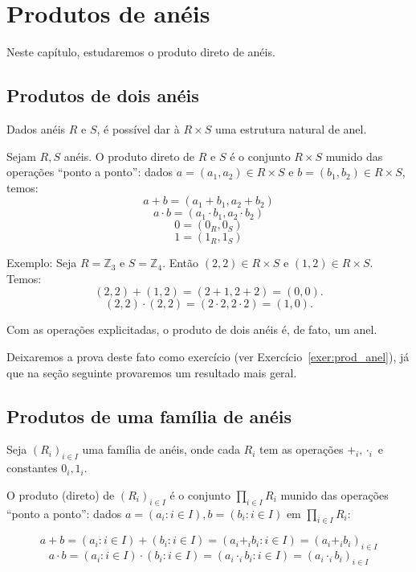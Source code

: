 \chapter{Produtos de anéis}
Neste capítulo, estudaremos o produto direto de anéis.

\section{Produtos de dois anéis}
Dados anéis $R$ e $S$, é possível dar à $R\times S$ uma estrutura natural de anel.
\begin{definition}
    Sejam $R, S$ anéis.
    O produto direto de $R$ e $S$ é o conjunto $R\times S$ munido das operações ``ponto a ponto'': dados $a=(a_1, a_2)\in R\times S$ e $b=(b_1, b_2)\in R\times S$, temos:
    \[a+b=(a_1+b_1, a_2+b_2)\]
    \[a\cdot b=(a_1\cdot b_1, a_2\cdot b_2)\]
    \[0=(0_R, 0_S)\]
    \[1=(1_R, 1_S)\]
\end{definition}

Exemplo: Seja $R=\mathbb Z_3$ e $S=\mathbb Z_4$. Então $(2, 2)\in R\times S$ e $(1, 2)\in R\times S$. Temos:
\[(2, 2)+(1, 2)=(2+ 1, 2+ 2)=(0, 0).\]
\[(2, 2)\cdot (2, 2)=(2\cdot 2, 2\cdot 2)=(1, 0).\]

Com as operações explicitadas, o produto de dois anéis é, de fato, um anel.

Deixaremos a prova deste fato como exercício (ver Exercício~\ref{exer:prod_anel}), já que na seção seguinte provaremos um resultado mais geral.

\section{Produtos de uma família de anéis}

\begin{definition}
    Seja $(R_i)_{i \in I}$ uma família de anéis, onde cada $R_i$ tem as operações $+_i, \cdot_i$ e constantes $0_i, 1_i$.
    
    O produto (direto) de $(R_i)_{i \in I}$ é o conjunto $\prod_{i \in I} R_i$ munido das operações ``ponto a ponto'': dados $a=(a_i: i \in I), b=(b_i: i \in I)$ em $\prod_{i \in I}R_i$:

    $$a+b=(a_i: i \in I)+(b_i: i \in I)=(a_i+_i b_i: i \in I)=(a_i+_ib_i)_{i \in I}$$
    $$a\cdot b=(a_i: i \in I)\cdot (b_i: i \in I)=(a_i\cdot _i b_i: i \in I)=(a_i\cdot _ib_i)_{i \in I}$$

\end{definition}

